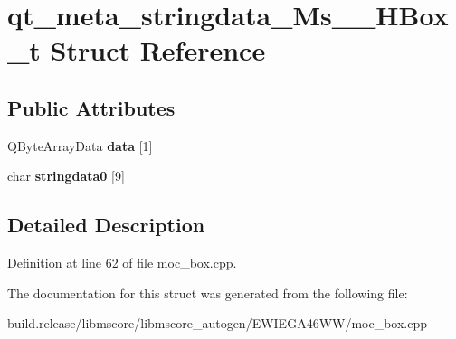 \hypertarget{structqt__meta__stringdata___ms_____h_box__t}{}\section{qt\+\_\+meta\+\_\+stringdata\+\_\+\+Ms\+\_\+\+\_\+\+H\+Box\+\_\+t Struct Reference}
\label{structqt__meta__stringdata___ms_____h_box__t}
\subsection*{Public Attributes}
\begin{DoxyCompactItemize}
\item 
\mbox{\label{structqt__meta__stringdata___ms_____h_box__t_ad145890141ea7b1f115bc79064a0a124}} 
Q\+Byte\+Array\+Data {\bfseries data} \mbox{[}1\mbox{]}
\item 
\mbox{\label{structqt__meta__stringdata___ms_____h_box__t_a0f106a15e551f37810c0989af89835cb}} 
char {\bfseries stringdata0} \mbox{[}9\mbox{]}
\end{DoxyCompactItemize}


\subsection{Detailed Description}


Definition at line 62 of file moc\+\_\+box.\+cpp.



The documentation for this struct was generated from the following file\+:\begin{DoxyCompactItemize}
\item 
build.\+release/libmscore/libmscore\+\_\+autogen/\+E\+W\+I\+E\+G\+A46\+W\+W/moc\+\_\+box.\+cpp\end{DoxyCompactItemize}

